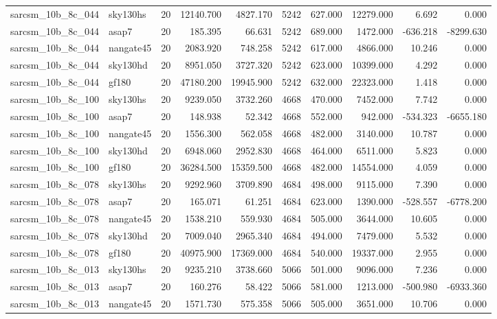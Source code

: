 \begin{tabular}{llrrrrrrrr}
sarcsm\_10b\_8c\_044 & sky130hs & 20 & 12140.700 & 4827.170 & 5242 & 627.000 & 12279.000 & 6.692 & 0.000 \\
sarcsm\_10b\_8c\_044 & asap7 & 20 & 185.395 & 66.631 & 5242 & 689.000 & 1472.000 & -636.218 & -8299.630 \\
sarcsm\_10b\_8c\_044 & nangate45 & 20 & 2083.920 & 748.258 & 5242 & 617.000 & 4866.000 & 10.246 & 0.000 \\
sarcsm\_10b\_8c\_044 & sky130hd & 20 & 8951.050 & 3727.320 & 5242 & 623.000 & 10399.000 & 4.292 & 0.000 \\
sarcsm\_10b\_8c\_044 & gf180 & 20 & 47180.200 & 19945.900 & 5242 & 632.000 & 22323.000 & 1.418 & 0.000 \\
sarcsm\_10b\_8c\_100 & sky130hs & 20 & 9239.050 & 3732.260 & 4668 & 470.000 & 7452.000 & 7.742 & 0.000 \\
sarcsm\_10b\_8c\_100 & asap7 & 20 & 148.938 & 52.342 & 4668 & 552.000 & 942.000 & -534.323 & -6655.180 \\
sarcsm\_10b\_8c\_100 & nangate45 & 20 & 1556.300 & 562.058 & 4668 & 482.000 & 3140.000 & 10.787 & 0.000 \\
sarcsm\_10b\_8c\_100 & sky130hd & 20 & 6948.060 & 2952.830 & 4668 & 464.000 & 6511.000 & 5.823 & 0.000 \\
sarcsm\_10b\_8c\_100 & gf180 & 20 & 36284.500 & 15359.500 & 4668 & 482.000 & 14554.000 & 4.059 & 0.000 \\
sarcsm\_10b\_8c\_078 & sky130hs & 20 & 9292.960 & 3709.890 & 4684 & 498.000 & 9115.000 & 7.390 & 0.000 \\
sarcsm\_10b\_8c\_078 & asap7 & 20 & 165.071 & 61.251 & 4684 & 623.000 & 1390.000 & -528.557 & -6778.200 \\
sarcsm\_10b\_8c\_078 & nangate45 & 20 & 1538.210 & 559.930 & 4684 & 505.000 & 3644.000 & 10.605 & 0.000 \\
sarcsm\_10b\_8c\_078 & sky130hd & 20 & 7009.040 & 2965.340 & 4684 & 494.000 & 7479.000 & 5.532 & 0.000 \\
sarcsm\_10b\_8c\_078 & gf180 & 20 & 40975.900 & 17369.000 & 4684 & 540.000 & 19337.000 & 2.955 & 0.000 \\
sarcsm\_10b\_8c\_013 & sky130hs & 20 & 9235.210 & 3738.660 & 5066 & 501.000 & 9096.000 & 7.236 & 0.000 \\
sarcsm\_10b\_8c\_013 & asap7 & 20 & 160.276 & 58.422 & 5066 & 581.000 & 1213.000 & -500.980 & -6933.360 \\
sarcsm\_10b\_8c\_013 & nangate45 & 20 & 1571.730 & 575.358 & 5066 & 505.000 & 3651.000 & 10.706 & 0.000 \\

\end{tabular}

